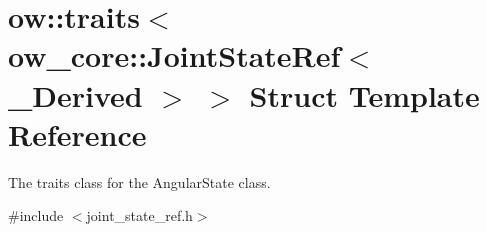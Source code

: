\hypertarget{structow_1_1traits_3_01ow__core_1_1JointStateRef_3_01__Derived_01_4_01_4}{}\section{ow\+:\+:traits$<$ ow\+\_\+core\+:\+:Joint\+State\+Ref$<$ \+\_\+\+Derived $>$ $>$ Struct Template Reference}
\label{structow_1_1traits_3_01ow__core_1_1JointStateRef_3_01__Derived_01_4_01_4}


The traits class for the Angular\+State class.  




{\ttfamily \#include $<$joint\+\_\+state\+\_\+ref.\+h$>$}

